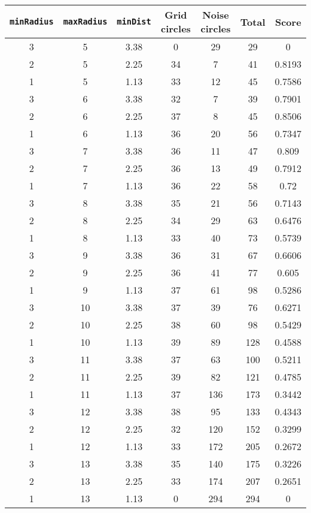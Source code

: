 \documentclass[letterpaper, 12pt]{article}
\begin{document}
\begin{longtable}{|c|c|c|c|c|c|c|}
\hline
\textbf{\texttt{minRadius}} & \textbf{\texttt{maxRadius}} & \textbf{\texttt{minDist}} & \textbf{Grid circles} & \textbf{Noise circles} & \textbf{Total} & \textbf{Score} \\
\hline
3 & 5 & 3.38 & 0 & 29 & 29 & 0 \\
\hline
2 & 5 & 2.25 & 34 & 7 & 41 & 0.8193 \\
\hline
1 & 5 & 1.13 & 33 & 12 & 45 & 0.7586 \\
\hline
3 & 6 & 3.38 & 32 & 7 & 39 & 0.7901 \\
\hline
2 & 6 & 2.25 & 37 & 8 & 45 & 0.8506 \\
\hline
1 & 6 & 1.13 & 36 & 20 & 56 & 0.7347 \\
\hline
3 & 7 & 3.38 & 36 & 11 & 47 & 0.809 \\
\hline
2 & 7 & 2.25 & 36 & 13 & 49 & 0.7912 \\
\hline
1 & 7 & 1.13 & 36 & 22 & 58 & 0.72 \\
\hline
3 & 8 & 3.38 & 35 & 21 & 56 & 0.7143 \\
\hline
2 & 8 & 2.25 & 34 & 29 & 63 & 0.6476 \\
\hline
1 & 8 & 1.13 & 33 & 40 & 73 & 0.5739 \\
\hline
3 & 9 & 3.38 & 36 & 31 & 67 & 0.6606 \\
\hline
2 & 9 & 2.25 & 36 & 41 & 77 & 0.605 \\
\hline
1 & 9 & 1.13 & 37 & 61 & 98 & 0.5286 \\
\hline
3 & 10 & 3.38 & 37 & 39 & 76 & 0.6271 \\
\hline
2 & 10 & 2.25 & 38 & 60 & 98 & 0.5429 \\
\hline
1 & 10 & 1.13 & 39 & 89 & 128 & 0.4588 \\
\hline
3 & 11 & 3.38 & 37 & 63 & 100 & 0.5211 \\
\hline
2 & 11 & 2.25 & 39 & 82 & 121 & 0.4785 \\
\hline
1 & 11 & 1.13 & 37 & 136 & 173 & 0.3442 \\
\hline
3 & 12 & 3.38 & 38 & 95 & 133 & 0.4343 \\
\hline
2 & 12 & 2.25 & 32 & 120 & 152 & 0.3299 \\
\hline
1 & 12 & 1.13 & 33 & 172 & 205 & 0.2672 \\
\hline
3 & 13 & 3.38 & 35 & 140 & 175 & 0.3226 \\
\hline
2 & 13 & 2.25 & 33 & 174 & 207 & 0.2651 \\
\hline
1 & 13 & 1.13 & 0 & 294 & 294 & 0 \\

\end{longtable}
\end{document}
